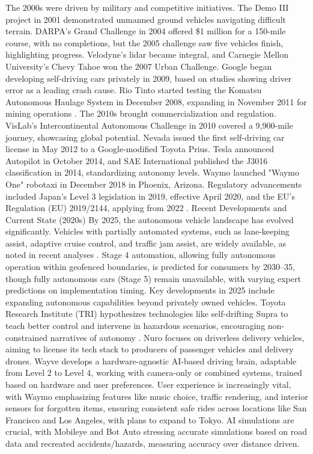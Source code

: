 The 2000s were driven by military and competitive initiatives. The Demo III project in 2001 demonstrated unmanned ground vehicles navigating difficult terrain. DARPA’s Grand Challenge in 2004 offered \$1 million for a 150-mile course, with no completions, but the 2005 challenge saw five vehicles finish, highlighting progress. Velodyne’s lidar became integral, and Carnegie Mellon University’s Chevy Tahoe won the 2007 Urban Challenge. Google began developing self-driving cars privately in 2009, based on studies showing driver error as a leading crash cause. Rio Tinto started testing the Komatsu Autonomous Haulage System in December 2008, expanding in November 2011 for mining operations .
The 2010s brought commercialization and regulation. VisLab’s Intercontinental Autonomous Challenge in 2010 covered a 9,900-mile journey, showcasing global potential. Nevada issued the first self-driving car license in May 2012 to a Google-modified Toyota Prius. Tesla announced Autopilot in October 2014, and SAE International published the J3016 classification in 2014, standardizing autonomy levels. Waymo launched "Waymo One" robotaxi in December 2018 in Phoenix, Arizona. Regulatory advancements included Japan’s Level 3 legislation in 2019, effective April 2020, and the EU’s Regulation (EU) 2019/2144, applying from 2022 .
Recent Developments and Current State (2020s)
By 2025, the autonomous vehicle landscape has evolved significantly. Vehicles with partially automated systems, such as lane-keeping assist, adaptive cruise control, and traffic jam assist, are widely available, as noted in recent analyses . Stage 4 automation, allowing fully autonomous operation within geofenced boundaries, is predicted for consumers by 2030–35, though fully autonomous cars (Stage 5) remain unavailable, with varying expert predictions on implementation timing.
Key developments in 2025 include expanding autonomous capabilities beyond privately owned vehicles. Toyota Research Institute (TRI) hypothesizes technologies like self-drifting Supra to teach better control and intervene in hazardous scenarios, encouraging non-constrained narratives of autonomy . Nuro focuses on driverless delivery vehicles, aiming to license its tech stack to producers of passenger vehicles and delivery drones. Wayve develops a hardware-agnostic AI-based driving brain, adaptable from Level 2 to Level 4, working with camera-only or combined systems, trained based on hardware and user preferences.
User experience is increasingly vital, with Waymo emphasizing features like music choice, traffic rendering, and interior sensors for forgotten items, ensuring consistent safe rides across locations like San Francisco and Los Angeles, with plans to expand to Tokyo. AI simulations are crucial, with Mobileye and Bot Auto stressing accurate simulations based on road data and recreated accidents/hazards, measuring accuracy over distance driven.
